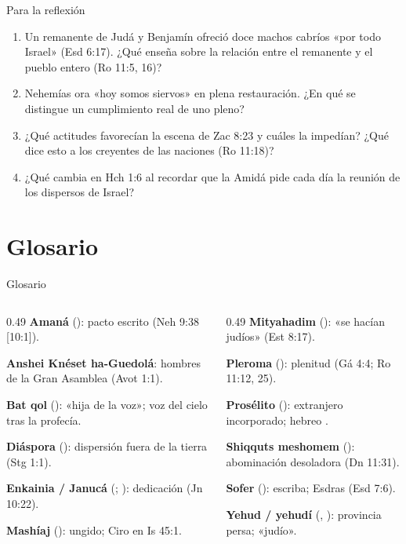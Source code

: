 \begin{frame}{Para la reflexión}
\small
\begin{enumerate}
\item Un remanente de Judá y Benjamín ofreció doce machos cabríos «por todo Israel» (Esd 6:17). ¿Qué enseña sobre la relación entre el remanente y el pueblo entero (Ro 11:5, 16)?\medskip
\item Nehemías ora «hoy somos siervos» en plena restauración. ¿En qué se distingue un cumplimiento real de uno pleno?\medskip
\item ¿Qué actitudes favorecían la escena de Zac 8:23 y cuáles la impedían? ¿Qué dice esto a los creyentes de las naciones (Ro 11:18)?\medskip
\item ¿Qué cambia en Hch 1:6 al recordar que la Amidá pide cada día la reunión de los dispersos de Israel?
\end{enumerate}
\end{frame}

\section{Glosario}
\begin{frame}{Glosario}
\begin{columns}[t,onlytextwidth]
\begin{column}{0.49\textwidth}\scriptsize
\textbf{Amaná} (): pacto escrito (Neh 9:38 [10:1]).\par\smallskip
\textbf{Anshei Knéset ha-Guedolá}: hombres de la Gran Asamblea (Avot 1:1).\par\smallskip
\textbf{Bat qol} (): «hija de la voz»; voz del cielo tras la profecía.\par\smallskip
\textbf{Diáspora} (): dispersión fuera de la tierra (Stg 1:1).\par\smallskip
\textbf{Enkainia / Janucá} (; ): dedicación (Jn 10:22).\par\smallskip
\textbf{Mashíaj} (): ungido; Ciro en Is 45:1.
\end{column}
\begin{column}{0.49\textwidth}\scriptsize
\textbf{Mityahadim} (): «se hacían judíos» (Est 8:17).\par\smallskip
\textbf{Pleroma} (): plenitud (Gá 4:4; Ro 11:12, 25).\par\smallskip
\textbf{Prosélito} (): extranjero incorporado; hebreo .\par\smallskip
\textbf{Shiqquts meshomem} (): abominación desoladora (Dn 11:31).\par\smallskip
\textbf{Sofer} (): escriba; Esdras (Esd 7:6).\par\smallskip
\textbf{Yehud / yehudí} (, ): provincia persa; «judío».
\end{column}
\end{columns}
\end{frame}

